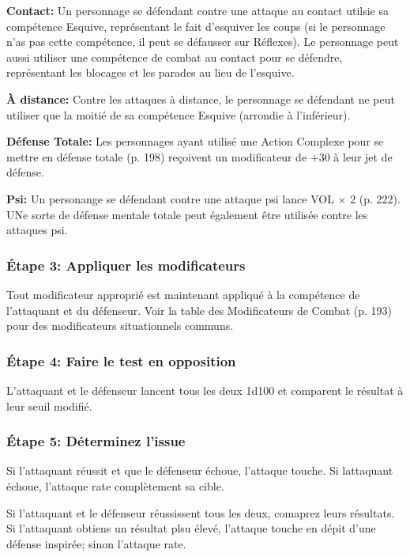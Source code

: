 \textbf{Contact:} Un personnage se défendant contre une attaque au contact utilsie sa compétence Esquive, représentant le fait d'esquiver les coups (si le personnage n'as pas cette compétence, il peut se défausser sur Réflexes). Le personnage peut aussi utiliser une compétence de combat au contact pour se défendre, représentant les blocages et les parades au lieu de l'esquive. 

\textbf{À distance:} Contre les attaques à distance, le personnage se défendant ne peut utiliser que la moitié de sa compétence Esquive (arrondie à l'inférieur). 

\textbf{Défense Totale:} Les personnages ayant utilisé une Action Complexe pour se mettre en défense totale (p. 198) reçoivent un modificateur de +30 à leur jet de défense. 

\textbf{Psi:} Un personange se défendant contre une attaque psi lance VOL $\times$ 2 (p. 222). UNe sorte de défense mentale totale peut également être utilisée contre les attaques psi. 

\subsubsection{Étape 3: Appliquer les modificateurs} 

Tout modificateur approprié est maintenant appliqué à la compétence de l'attaquant et du défenseur. Voir la table des Modificateurs de Combat (p. 193) pour des modificateurs situationnels communs. 

\subsubsection{Étape 4: Faire le test en opposition} 

L'attaquant et le défenseur lancent tous les deux 1d100 et comparent le résultat à leur seuil modifié. 

\subsubsection{Étape 5: Déterminez l'issue} 

Si l'attaquant réussit et que le défenseur échoue, l'attaque touche. Si lattaquant échoue, l'attaque rate complètement sa cible. 

Si l'attaquant et le défenseur réussissent tous les deux, comaprez leurs résultats. Si l'attaquant obtiens un résultat plsu élevé, l'attaque touche en dépit d'une défense inspirée; sinon l'attaque rate. 


